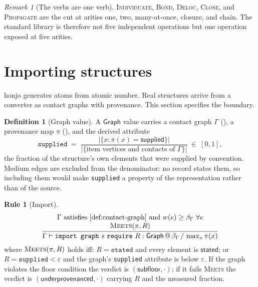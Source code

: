 \documentclass[11pt,twocolumn,a4paper]{article}
\theoremstyle{thmstyle}
\theoremstyle{definition}
\newtheorem{definition}[theorem]{Definition}
\newtheorem{rulename}[theorem]{Rule}
\theoremstyle{remark}
\newtheorem{remark}[theorem]{Remark}
\newcommand{\flo}{\beta}
\newcommand{\hj}[1]{\texttt{#1}}
\newcommand{\abs}[1]{\lvert#1\rvert}
\newcommand{\stated}{\textsf{stated}}
\newcommand{\supplied}{\textsf{supplied}}
\newcommand{\Prov}{\pi}
\newcommand{\eps}{\varepsilon}
\begin{document}
\begin{remark}[The verbs are one verb]
\label{rem:one-verb}
\textsc{Individuate}, \textsc{Bond}, \textsc{Deloc}, \textsc{Close}, and
\textsc{Propagate} are the cut at arities one, two, many-at-once, closure,
and chain. The standard library is therefore not five independent
operations but one operation exposed at five arities.
\end{remark}

\section{Importing structures}
\label{sec:import}

honjo generates atoms from atomic number. Real structures arrive from a
converter as contact graphs with provenance. This section specifies the
boundary.

\begin{definition}[Graph value]
\label{def:graphval}
A $\mathsf{Graph}$ value carries a contact graph $\Gamma$
(), a provenance map $\Prov$
(), and the derived attribute
\[
\hj{supplied}\;=\;\frac{\abs{\{x : \Prov(x)=\supplied\}}}
{\abs{\{\text{item vertices and contacts of }\Gamma\}}}\;\in\;[0,1],
\]
the fraction of the structure's own elements that were supplied by
convention. Medium edges are excluded from the denominator: no record
states them, so including them would make \hj{supplied} a property of the
representation rather than of the source.
\end{definition}

\begin{rulename}[Import]
\label{rule:import}
\[
\frac{\begin{array}{c}
       \Gamma\text{ satisfies }\Cref{def:contact-graph}\text{ and }
       w(e)\ge\flo_\Gamma\ \forall e\\
       \textsc{Meets}(\Prov,R)
      \end{array}}
     {\Gamma\vdash \hj{import\ graph}\ s\ \hj{require}\ R :
      \mathsf{Graph}\,@\,\flo_\Gamma\,/\,\max_x \Prov(x)}
\]
where $\textsc{Meets}(\Prov,R)$ holds iff: $R=\hj{stated}$ and every
element is $\stated$; or $R=\hj{supplied} < \eps$ and the graph's
\hj{supplied} attribute is below $\eps$. If the graph violates the floor
condition the verdict is $(\textsf{subfloor},\cdot)$; if it fails
\textsc{Meets} the verdict is $(\textsf{underprovenanced},\cdot)$ carrying
$R$ and the measured fraction.
\end{rulename}
\end{document}
